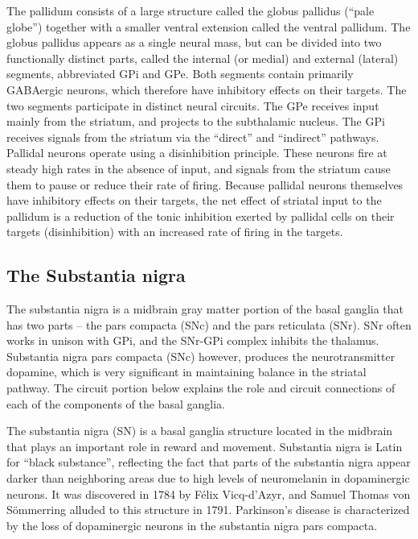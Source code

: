 \documentclass[]{book}
\begin{document}
The pallidum consists of a large structure called the globus pallidus (``pale globe'') together with a smaller ventral extension called the ventral pallidum. The globus pallidus appears as a single neural mass, but can be divided into two functionally distinct parts, called the internal (or medial) and external (lateral) segments, abbreviated GPi and GPe. Both segments contain primarily GABAergic neurons, which therefore have inhibitory effects on their targets. The two segments participate in distinct neural circuits. The GPe receives input mainly from the striatum, and projects to the subthalamic nucleus. The GPi receives signals from the striatum via the ``direct'' and ``indirect'' pathways. Pallidal neurons operate using a disinhibition principle. These neurons fire at steady high rates in the absence of input, and signals from the striatum cause them to pause or reduce their rate of firing. Because pallidal neurons themselves have inhibitory effects on their targets, the net effect of striatal input to the pallidum is a reduction of the tonic inhibition exerted by pallidal cells on their targets (disinhibition) with an increased rate of firing in the targets.

\hypertarget{the-substantia-nigra}{%
\subsection{The Substantia nigra}\label{the-substantia-nigra}}

The substantia nigra is a midbrain gray matter portion of the basal ganglia that has two parts -- the pars compacta (SNc) and the pars reticulata (SNr). SNr often works in unison with GPi, and the SNr-GPi complex inhibits the thalamus. Substantia nigra pars compacta (SNc) however, produces the neurotransmitter dopamine, which is very significant in maintaining balance in the striatal pathway. The circuit portion below explains the role and circuit connections of each of the components of the basal ganglia.

The substantia nigra (SN) is a basal ganglia structure located in the midbrain that plays an important role in reward and movement. Substantia nigra is Latin for ``black substance'', reflecting the fact that parts of the substantia nigra appear darker than neighboring areas due to high levels of neuromelanin in dopaminergic neurons. It was discovered in 1784 by Félix Vicq-d'Azyr, and Samuel Thomas von Sömmerring alluded to this structure in 1791. Parkinson's disease is characterized by the loss of dopaminergic neurons in the substantia nigra pars compacta.
\end{document}
